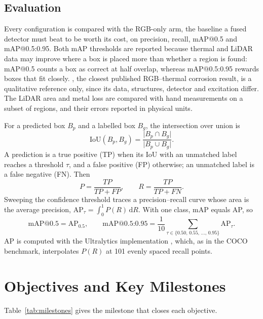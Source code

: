 \subsection{Evaluation}
\label{sec:evaluation}

Every configuration is compared with the RGB-only arm, the baseline a fused
detector must beat to be worth its cost, on precision, recall, mAP@0.5 and
mAP@0.5:0.95. Both mAP thresholds are reported because thermal and LiDAR data may
improve where a box is placed more than whether a region is found: mAP@0.5 counts
a box as correct at half overlap, whereas mAP@0.5:0.95 rewards boxes that fit
closely. \citet{Lim2021}, the closest published RGB--thermal corrosion result, is
a qualitative reference only, since its data, structures, detector and excitation
differ. The LiDAR area and metal loss are compared with hand measurements on a
subset of regions, and their errors reported in physical units.

For a predicted box $B_p$ and a labelled box $B_g$, the intersection over union is
\begin{equation}
\mathrm{IoU}(B_p,B_g) = \frac{\lvert B_p \cap B_g \rvert}{\lvert B_p \cup B_g \rvert}.
\label{eq:iou}
\end{equation}
A prediction is a true positive (TP) when its IoU with an unmatched label
reaches a threshold $\tau$, and a false positive (FP) otherwise; an unmatched
label is a false negative (FN). Then
\begin{equation}
P = \frac{TP}{TP+FP}, \qquad R = \frac{TP}{TP+FN}.
\label{eq:pr}
\end{equation}
Sweeping the confidence threshold traces a precision--recall curve whose area
is the average precision,
$\mathrm{AP}_\tau = \int_0^1 P(R)\,\mathrm{d}R$. With one class, mAP equals AP, so
\begin{equation}
\text{mAP@0.5} = \mathrm{AP}_{0.5}, \qquad
\text{mAP@0.5:0.95} = \frac{1}{10} \sum_{\tau \in \{0.50,\,0.55,\,\ldots,\,0.95\}} \mathrm{AP}_\tau .
\label{eq:map}
\end{equation}
AP is computed with the Ultralytics implementation \citep{Ultralytics2023}, which,
as in the COCO benchmark, interpolates $P(R)$ at 101 evenly spaced recall points.

\section{Objectives and Key Milestones}
\label{sec:milestones}

Table~\ref{tab:milestones} gives the milestone that closes each objective.

